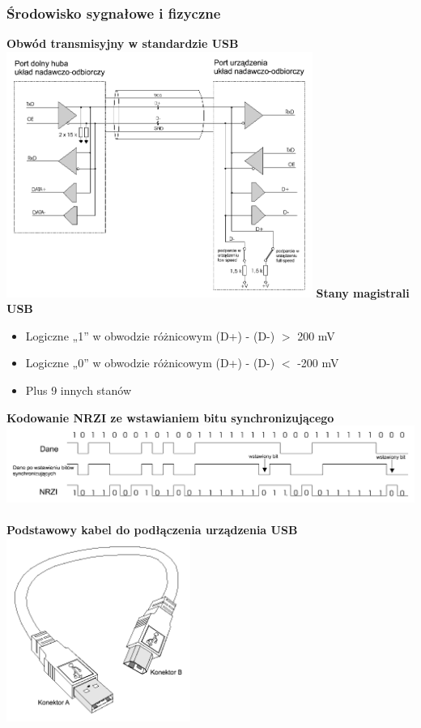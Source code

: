 		\subsubsection{Środowisko sygnałowe i fizyczne}
			\textbf{Obwód transmisyjny w standardzie USB}\\
			\includegraphics[width=10cm]{./wyklady/USB_7_1.pdf}
			\textbf{Stany magistrali USB}\\
			\begin{itemize}
				\item Logiczne „1” w obwodzie różnicowym (D+) - (D-) $>$ 200 mV
				\item Logiczne „0” w obwodzie różnicowym (D+) - (D-) $<$ -200 mV
				\item Plus 9 innych stanów
			\end{itemize}
			\textbf{Kodowanie NRZI ze wstawianiem bitu synchronizującego}\\
			\includegraphics[width=15cm]{./wyklady/USB_9_1.pdf}\\\\
			\textbf{Podstawowy kabel do podłączenia urządzenia USB}\\
			\includegraphics[width=6cm]{./wyklady/USB_10_1.pdf}
